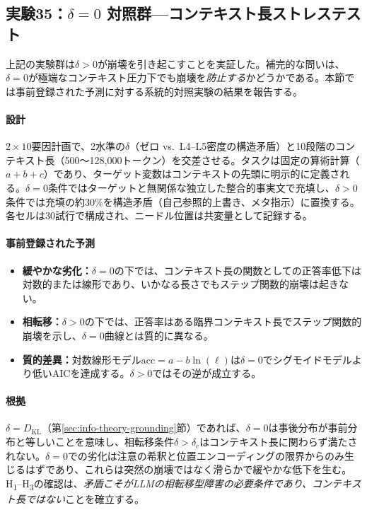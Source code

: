 \documentclass[11pt,a4paper]{article}
\begin{document}
\begin{table}[htbp]
\label{tab:llm-summary}
\end{table}

\subsection{実験35：$\delta = 0$ 対照群---コンテキスト長ストレステスト}
\label{sec:exp35}

上記の実験群は$\delta > 0$が崩壊を引き起こすことを実証した。補完的な問いは、$\delta = 0$が極端なコンテキスト圧力下でも崩壊を\emph{防止する}かどうかである。本節では事前登録された予測に対する系統的対照実験の結果を報告する。

\paragraph{設計}
$2 \times 10$要因計画で、2水準の$\delta$（ゼロ vs.\ L4--L5密度の構造矛盾）と10段階のコンテキスト長（500〜128{,}000トークン）を交差させる。タスクは固定の算術計算（$a + b + c$）であり、ターゲット変数はコンテキストの先頭に明示的に定義される。$\delta = 0$条件ではターゲットと無関係な独立した整合的事実文で充填し、$\delta > 0$条件では充填の約30\%を構造矛盾（自己参照的上書き、メタ指示）に置換する。各セルは30試行で構成され、ニードル位置は共変量として記録する。

\paragraph{事前登録された予測}
\begin{itemize}
  \item[\textbf{H\textsubscript{1}}] \textbf{緩やかな劣化：}$\delta = 0$の下では、コンテキスト長の関数としての正答率低下は対数的または線形であり、いかなる長さでもステップ関数的崩壊は起きない。
  \item[\textbf{H\textsubscript{2}}] \textbf{相転移：}$\delta > 0$の下では、正答率はある臨界コンテキスト長でステップ関数的崩壊を示し、$\delta = 0$曲線とは質的に異なる。
  \item[\textbf{H\textsubscript{3}}] \textbf{質的差異：}対数線形モデル$\text{acc} = a - b \ln(\ell)$は$\delta = 0$でシグモイドモデルより低いAICを達成する。$\delta > 0$ではその逆が成立する。
\end{itemize}

\paragraph{根拠}
$\delta = D_{\mathrm{KL}}$（第\ref{sec:info-theory-grounding}節）であれば、$\delta = 0$は事後分布が事前分布と等しいことを意味し、相転移条件$\delta > \delta_c$はコンテキスト長に関わらず満たされない。$\delta = 0$での劣化は注意の希釈と位置エンコーディングの限界からのみ生じるはずであり、これらは突然の崩壊ではなく滑らかで緩やかな低下を生む。H\textsubscript{1}--H\textsubscript{3}の確認は、\emph{矛盾こそがLLMの相転移型障害の必要条件であり、コンテキスト長ではない}ことを確立する。
\end{document}
